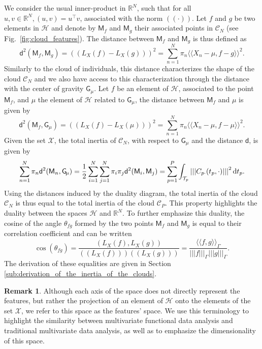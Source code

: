 \documentclass[times,sort&compress,3p]{elsarticle}
\theoremstyle{plain}%
\theoremstyle{definition}
\newtheorem{remark}{Remark}
\newcommand{\RR}{\mathbb{R}} %
\newcommand{\XX}{\mathcal{X}} %
\newcommand{\dd}{{\rm d}}
\newcommand{\TT}[1]{\mathcal{T}_{#1}} %
\newcommand{\HH}{\mathcal{H}} %
\newcommand{\inR}[2]{\left(#1, #2\right)}
\newcommand{\normR}[1]{\left(\!\left(#1\right)\!\right)} %
\newcommand{\inH}[2]{\langle\!\langle#1, #2\rangle\!\rangle}
\newcommand{\inHG}[2]{\langle\!\langle#1, #2\rangle\!\rangle_\Gamma}
\newcommand{\normH}[1]{\left|\left|\left|#1\right|\right|\right|}
\newcommand{\normHG}[1]{\left|\left|\left|#1\right|\right|\right|_\Gamma}
\newcommand{\CN}{\mathcal{C}_{\!N}} %
\newcommand{\pfea}[1]{\mathsf{#1}} %
\newcommand{\CP}{\mathcal{C}_{\!P}} %
\newcommand{\Gfea}{\pfea{G}_{\!\mu}} %
\begin{document}
We consider the usual inner-product in $\RR^N$, such that for all $u, v \in \RR^N, \inR{u}{v} = u^\top v$, associated with the norm $\normR{\cdot}$. Let $f$ and $g$ be two elements in $\HH$ and denote by $\pfea{M}_f$ and $\pfea{M}_g$ their associated points in $\CN$ (see Fig.~\ref{fig:cloud_features}). The distance between $\pfea{M}_f$ and $\pfea{M}_g$ is thus defined as
\begin{equation*}
\mathsf{d}^2(\pfea{M}_f, \pfea{M}_g) = \normR{L_X(f) - L_X(g)}^2 = \sum_{n = 1}^N \pi_n \inH{X_n - \mu}{f - g}^2.
\end{equation*}
Similarly to the cloud of individuals, this distance characterizes the shape of the cloud $\CN$ and we also have access to this characterization through the distance with the center of gravity $\Gfea$. Let $f$ be an element of $\HH$, associated to the point $\pfea{M}_f$, and $\mu$ the element of $\HH$ related to $\Gfea$, the distance between $\pfea{M}_f$ and $\mu$ is given by
\begin{equation*}
\mathsf{d}^2(\pfea{M}_f, \Gfea) = \normR{L_X(f) - L_X(\mu)}^2 = \sum_{n = 1}^N \pi_n \inH{X_n - \mu}{f - \mu}^2.
\end{equation*}
Given the set $\XX$, the total inertia of $\CN$, with respect to $\Gfea$ and the distance $\mathsf{d}$, is given by
\begin{equation}\label{eq:inertia_CN}
    \sum_{n = 1}^N \pi_n \mathsf{d}^2(\pfea{M}_n, \Gfea) = \frac{1}{2}\sum_{i = 1}^N \sum_{j = 1}^N \pi_i \pi_j \mathsf{d}^2(\pfea{M}_i, \pfea{M}_j) = \sum_{p = 1}^P \int_{\TT{p}} \normH{C_{p \cdot}(t_p, \cdot)}^2 \dd t_p.
\end{equation}
Using the distances induced by the duality diagram, the total inertia of the cloud $\CN$ is thus equal to the total inertia of the cloud $\CP$. This property highlights the duality between the spaces $\HH$ and $\RR^N$. To further emphasize this duality, the cosine of the angle $\theta_{fg}$ formed by the two points $\pfea{M}_f$ and $\pfea{M}_g$ is equal to their correlation coefficient and can be written
\begin{equation}
    \cos(\theta_{fg}) = \frac{\inR{L_X(f)}{L_X(g)}}{\normR{L_X(f)}\normR{L_X(g)}}
    = \frac{\inHG{f}{g}}{\normHG{f}\normHG{g}}.
\end{equation}
The derivation of these equalities are given in Section \ref{sub:derivation_of_the_inertia_of_the_clouds}.

\begin{remark}
   Although each axis of the space does not directly represent the features, but rather the projection of an element of $\HH$ onto the elements of the set $\XX$, we refer to this space as the features' space. We use this terminology to highlight the similarity between multivariate functional data analysis and traditional multivariate data analysis, as well as to emphasize the dimensionality of this space.
\end{remark}
\end{document}
